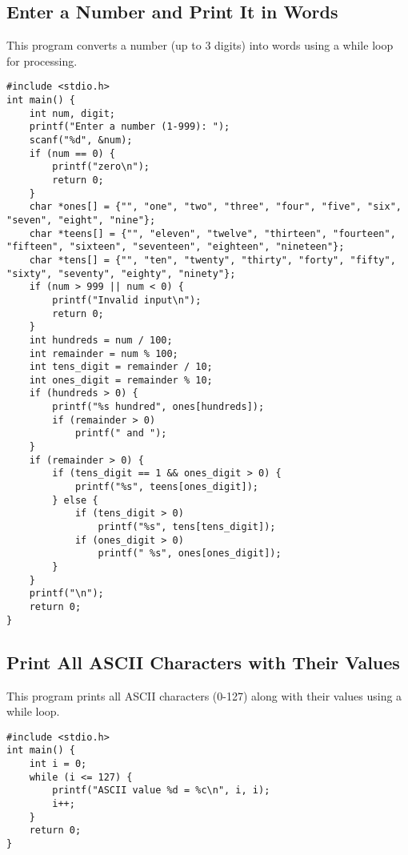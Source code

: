\documentclass[a4paper,12pt]{article}
\begin{document}
\newpage

\subsection{Enter a Number and Print It in Words}
This program converts a number (up to 3 digits) into words using a while loop for processing.

\begin{lstlisting}[caption={Enter a Number and Print It in Words}]
#include <stdio.h>
int main() {
    int num, digit;
    printf("Enter a number (1-999): ");
    scanf("%d", &num);
    if (num == 0) {
        printf("zero\n");
        return 0;
    }
    char *ones[] = {"", "one", "two", "three", "four", "five", "six", "seven", "eight", "nine"};
    char *teens[] = {"", "eleven", "twelve", "thirteen", "fourteen", "fifteen", "sixteen", "seventeen", "eighteen", "nineteen"};
    char *tens[] = {"", "ten", "twenty", "thirty", "forty", "fifty", "sixty", "seventy", "eighty", "ninety"};
    if (num > 999 || num < 0) {
        printf("Invalid input\n");
        return 0;
    }
    int hundreds = num / 100;
    int remainder = num % 100;
    int tens_digit = remainder / 10;
    int ones_digit = remainder % 10;
    if (hundreds > 0) {
        printf("%s hundred", ones[hundreds]);
        if (remainder > 0)
            printf(" and ");
    }
    if (remainder > 0) {
        if (tens_digit == 1 && ones_digit > 0) {
            printf("%s", teens[ones_digit]);
        } else {
            if (tens_digit > 0)
                printf("%s", tens[tens_digit]);
            if (ones_digit > 0)
                printf(" %s", ones[ones_digit]);
        }
    }
    printf("\n");
    return 0;
}
\end{lstlisting}

\newpage

\subsection{Print All ASCII Characters with Their Values}
This program prints all ASCII characters (0-127) along with their values using a while loop.

\begin{lstlisting}[caption={Print All ASCII Characters with Their Values}]
#include <stdio.h>
int main() {
    int i = 0;
    while (i <= 127) {
        printf("ASCII value %d = %c\n", i, i);
        i++;
    }
    return 0;
}
\end{lstlisting}
\end{document}
